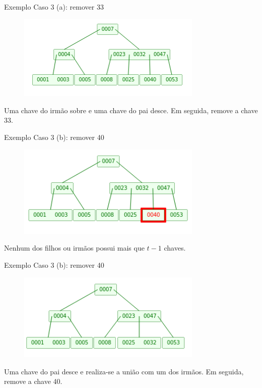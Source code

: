 \documentclass[aspectratio=169]{beamer}
\begin{document}
{%

\begin{frame}{Exemplo}
Caso 3 (a): remover 33
\begin{figure}[!h]
\centering
   \includegraphics[width=250pt]{imagens/remocao12.png}
  \label{fig_remocao12}
\end{figure} 
Uma chave do irmão sobre e uma chave do pai desce. Em seguida, remove a chave 33.	
\end{frame}


\begin{frame}{Exemplo}
Caso 3 (b): remover 40
\begin{figure}[!h]
\centering
   \includegraphics[width=250pt]{imagens/remocao13.png}
  \label{fig_remocao13}
\end{figure} 
Nenhum dos filhos ou irmãos possui mais que $t-1$ chaves. 
\end{frame}


\begin{frame}{Exemplo}
Caso 3 (b): remover 40
\begin{figure}[!h]
\centering
   \includegraphics[width=250pt]{imagens/remocao14.png}
  \label{fig_remocao14}
\end{figure} 
Uma chave do pai desce e realiza-se a união com um dos irmãos. Em seguida, remove a chave 40.
\end{frame}

}
\end{document}
